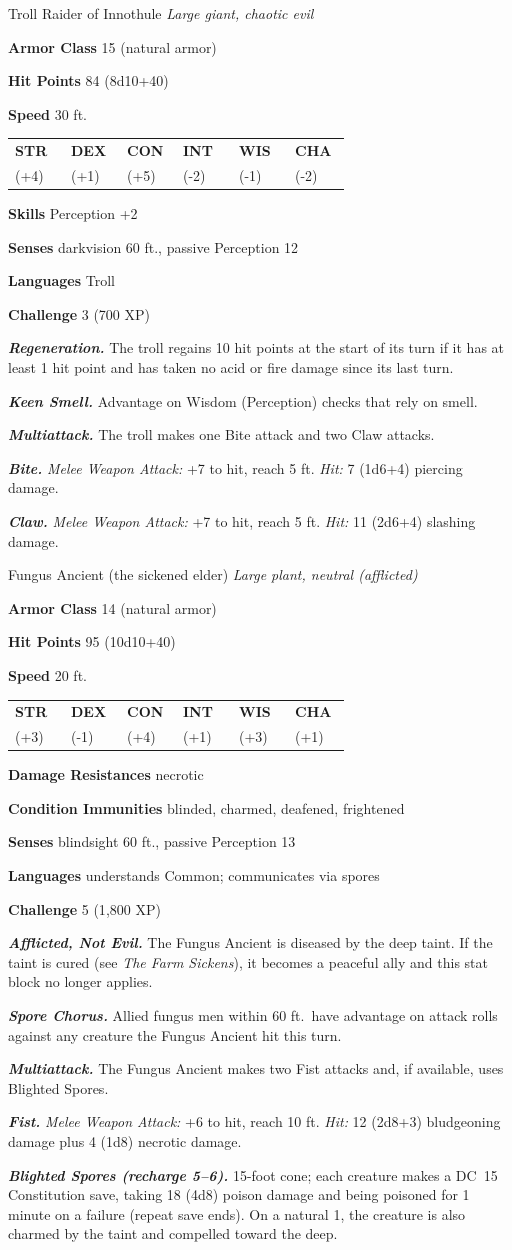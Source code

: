 \documentclass[10pt,twoside]{report}
\makeatletter
\newcommand{\msub}[1]{{\itshape #1}\par}
\newcommand{\mrule}{\par\vspace{2pt}{\color{gukred}\rule{\linewidth}{1.1pt}}\par\vspace{2pt}}
\newcommand{\mthin}{\par\vspace{1pt}{\color{gukred!60}\rule{\linewidth}{0.5pt}}\par\vspace{2pt}}
\newcommand{\mfield}[2]{\noindent\textbf{\color{gukred}#1} #2\par}
\newcommand{\mhead}[1]{\par\smallskip{\sffamily\bfseries\scshape\color{gukred}#1}\par
  \vspace{-3pt}{\color{gukred}\rule{\linewidth}{0.7pt}}\par\vspace{2pt}}
\newcommand{\mtrait}[2]{\noindent\textbf{\itshape #1} #2\par\vspace{2pt}}
\newcommand{\abilities}[6]{\par\smallskip\noindent
  {\setlength{\tabcolsep}{1.5pt}%
  \begin{tabular}{@{}*{6}{p{0.15\linewidth}}@{}}
  \centering\sffamily\bfseries\color{gukred}STR &\centering\sffamily\bfseries\color{gukred}DEX
  &\centering\sffamily\bfseries\color{gukred}CON &\centering\sffamily\bfseries\color{gukred}INT
  &\centering\sffamily\bfseries\color{gukred}WIS &\centering\arraybackslash\sffamily\bfseries\color{gukred}CHA\\
  \centering #1 &\centering #2 &\centering #3 &\centering #4 &\centering #5 &\centering\arraybackslash #6\\
  \end{tabular}}\par\smallskip}
\newcommand{\dc}[1]{DC~#1}
\makeatother
\begin{document}
\begin{statblock}{Troll Raider of Innothule}
\msub{Large giant, chaotic evil}
\mrule
\mfield{Armor Class}{15 (natural armor)}
\mfield{Hit Points}{84 (8d10+40)}
\mfield{Speed}{30 ft.}
\abilities{18 (+4)}{13 (+1)}{20 (+5)}{7 (-2)}{9 (-1)}{7 (-2)}
\mthin
\mfield{Skills}{Perception +2}
\mfield{Senses}{darkvision 60 ft., passive Perception 12}
\mfield{Languages}{Troll}
\mfield{Challenge}{3 (700 XP)}
\mrule
\mtrait{Regeneration.}{The troll regains 10 hit points at the start of its turn if it has at least 1 hit point and has taken no acid or fire damage since its last turn.}
\mtrait{Keen Smell.}{Advantage on Wisdom (Perception) checks that rely on smell.}
\mhead{Actions}
\mtrait{Multiattack.}{The troll makes one Bite attack and two Claw attacks.}
\mtrait{Bite.}{\textit{Melee Weapon Attack:} +7 to hit, reach 5 ft. \textit{Hit:} 7 (1d6+4) piercing damage.}
\mtrait{Claw.}{\textit{Melee Weapon Attack:} +7 to hit, reach 5 ft. \textit{Hit:} 11 (2d6+4) slashing damage.}
\end{statblock}

\begin{statblock}{Fungus Ancient (the sickened elder)}
\msub{Large plant, neutral (afflicted)}
\mrule
\mfield{Armor Class}{14 (natural armor)}
\mfield{Hit Points}{95 (10d10+40)}
\mfield{Speed}{20 ft.}
\abilities{16 (+3)}{9 (-1)}{18 (+4)}{13 (+1)}{16 (+3)}{12 (+1)}
\mthin
\mfield{Damage Resistances}{necrotic}
\mfield{Condition Immunities}{blinded, charmed, deafened, frightened}
\mfield{Senses}{blindsight 60 ft., passive Perception 13}
\mfield{Languages}{understands Common; communicates via spores}
\mfield{Challenge}{5 (1{,}800 XP)}
\mrule
\mtrait{Afflicted, Not Evil.}{The Fungus Ancient is diseased by the deep taint. If the taint is cured (see \textit{The Farm Sickens}), it becomes a peaceful ally and this stat block no longer applies.}
\mtrait{Spore Chorus.}{Allied fungus men within 60 ft.\ have advantage on attack rolls against any creature the Fungus Ancient hit this turn.}
\mhead{Actions}
\mtrait{Multiattack.}{The Fungus Ancient makes two Fist attacks and, if available, uses Blighted Spores.}
\mtrait{Fist.}{\textit{Melee Weapon Attack:} +6 to hit, reach 10 ft. \textit{Hit:} 12 (2d8+3) bludgeoning damage plus 4 (1d8) necrotic damage.}
\mtrait{Blighted Spores (recharge 5--6).}{15-foot cone; each creature makes a \dc{15} Constitution save, taking 18 (4d8) poison damage and being poisoned for 1 minute on a failure (repeat save ends). On a natural 1, the creature is also charmed by the taint and compelled toward the deep.}
\end{statblock}
\end{document}
